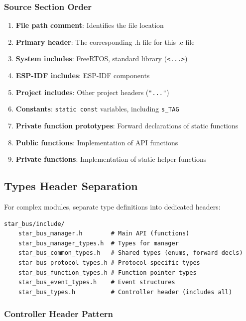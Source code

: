\subsubsection{Source Section Order}

\begin{enumerate}
    \item \textbf{File path comment}: Identifies the file location
    \item \textbf{Primary header}: The corresponding .h file for this .c file
    \item \textbf{System includes}: FreeRTOS, standard library (\texttt{<...>})
    \item \textbf{ESP-IDF includes}: ESP-IDF components
    \item \textbf{Project includes}: Other project headers (\texttt{"..."})
    \item \textbf{Constants}: \texttt{static const} variables, including \texttt{s\_TAG}
    \item \textbf{Private function prototypes}: Forward declarations of static functions
    \item \textbf{Public functions}: Implementation of API functions
    \item \textbf{Private functions}: Implementation of static helper functions
\end{enumerate}

\subsection{Types Header Separation}

For complex modules, separate type definitions into dedicated headers:

\begin{verbatim}
star_bus/include/
    star_bus_manager.h        # Main API (functions)
    star_bus_manager_types.h  # Types for manager
    star_bus_common_types.h   # Shared types (enums, forward decls)
    star_bus_protocol_types.h # Protocol-specific types
    star_bus_function_types.h # Function pointer types
    star_bus_event_types.h    # Event structures
    star_bus_types.h          # Controller header (includes all)
\end{verbatim}

\subsubsection{Controller Header Pattern}

